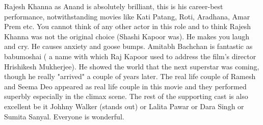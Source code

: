 \documentclass[11pt]{article}
\begin{document}
Rajesh Khanna as Anand is absolutely brilliant, this is his career-best performance, notwithstanding movies like Kati Patang, Roti, Aradhana, Amar Prem etc. You cannot think of any other actor in this role and to think Rajesh Khanna was not the original choice (Shashi Kapoor was). He makes you laugh and cry. He causes anxiety and goose bumps. Amitabh Bachchan is fantastic as babumoshai ( a name with which Raj Kapoor used to address the film's director Hrishikesh Mukherjee). He showed the world that the next superstar was coming, though he really "arrived" a couple of years later. The real life couple of Ramesh and Seema Deo appeared as real life couple in this movie and they performed superbly especially in the climax scene. The rest of the supporting cast is also excellent be it Johhny Walker (stands out) or Lalita Pawar or Dara Singh or Sumita Sanyal. Everyone is wonderful.
\end{document}
